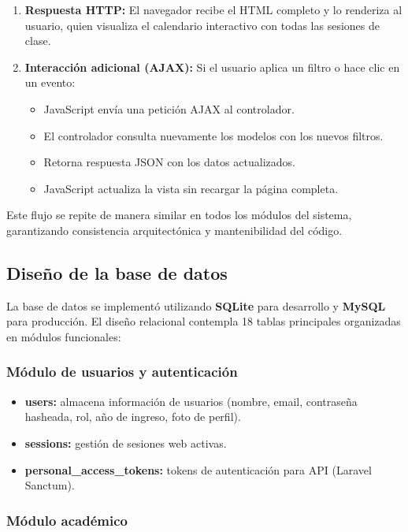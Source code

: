 \begin{enumerate}
    \item \textbf{Respuesta HTTP:} El navegador recibe el HTML completo y lo renderiza al usuario, quien visualiza el calendario interactivo con todas las sesiones de clase.
    
    \item \textbf{Interacción adicional (AJAX):} Si el usuario aplica un filtro o hace clic en un evento:
    \begin{itemize}
        \item JavaScript envía una petición AJAX al controlador.
        \item El controlador consulta nuevamente los modelos con los nuevos filtros.
        \item Retorna respuesta JSON con los datos actualizados.
        \item JavaScript actualiza la vista sin recargar la página completa.
    \end{itemize}
\end{enumerate}

Este flujo se repite de manera similar en todos los módulos del sistema, garantizando consistencia arquitectónica y mantenibilidad del código.

\subsection{Diseño de la base de datos}

La base de datos se implementó utilizando \textbf{SQLite} para desarrollo y \textbf{MySQL} para producción. El diseño relacional contempla 18 tablas principales organizadas en módulos funcionales:

\subsubsection{Módulo de usuarios y autenticación}

\begin{itemize}
    \item \textbf{users:} almacena información de usuarios (nombre, email, contraseña hasheada, rol, año de ingreso, foto de perfil).
    \item \textbf{sessions:} gestión de sesiones web activas.
    \item \textbf{personal\_access\_tokens:} tokens de autenticación para API (Laravel Sanctum).
\end{itemize}

\subsubsection{Módulo académico}

